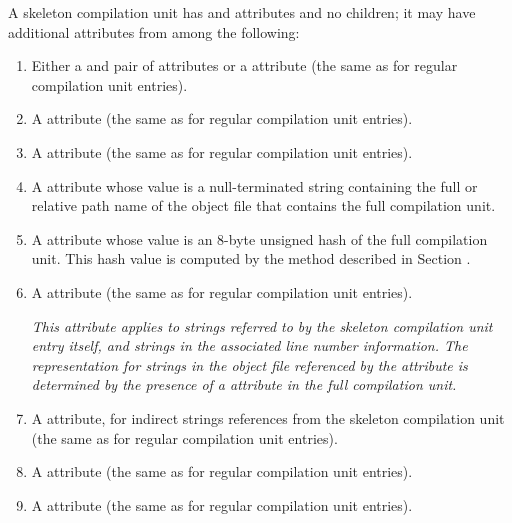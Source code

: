A skeleton compilation unit has \DWATdwoname{} and 
\DWATdwoid{} attributes and no children; it may have additional
attributes from among the following:
\begin{enumerate}[1. ]

\item
Either a \DWATlowpc{} and \DWAThighpc{} pair of attributes
or a \DWATranges{} attribute (the same as for regular
compilation unit entries).

\item
A \DWATstmtlist{} attribute (the same as for regular
compilation unit entries).

\item
A \DWATcompdir{} attribute (the same as for regular
compilation unit entries).

\item
{}
A \DWATdwonameNAME{} attribute whose value is a
null-terminated string containing the full or relative
path name of the object file that contains the full
compilation unit.

\item
{}
A \DWATdwoidNAME{} attribute whose value is an 8-byte
unsigned hash of the full compilation unit.  This hash
value is computed by the method described in 
Section .

\item
A \DWATuseUTFeight{} attribute (the same as for regular compilation unit
entries).

\textit{This attribute applies to strings referred to by the skeleton
compilation unit entry itself, and strings in the associated line
number information.
The representation for strings in the object file referenced 
by the \DWATdwoname{} attribute is determined by the presence 
of a \DWATuseUTFeight{} attribute in the full compilation unit.}

\item
A \DWATstroffsetsbase{} attribute, for indirect strings references 
from the skeleton compilation unit (the same as for regular 
compilation unit entries).

\item
A \DWATaddrbase{} attribute (the same as for regular
compilation unit entries).

\item
A \DWATrangesbase{} attribute (the same as for regular
compilation unit entries).

\end{enumerate}

